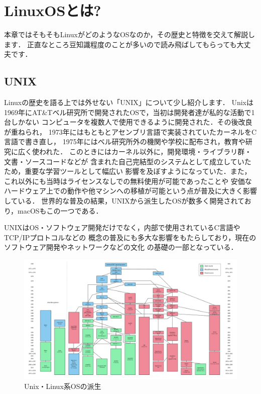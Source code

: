 \documentclass[autodetect-engine,dvi=dvipdfmx,ja=standard,a4j]{bxjsarticle}
\begin{document}
\section{LinuxOSとは?}
本章ではそもそもLinuxがどのようなOSなのか，その歴史と特徴を交えて解説します．
正直なところ豆知識程度のことが多いので読み飛ばしてもらっても大丈夫です．

\subsection{UNIX}
Linuxの歴史を語る上では外せない「UNIX」について少し紹介します．
Unixは1969年にAT\&Tベル研究所で開発されたOSで，当初は開発者達が私的な活動で1台しかない
コンピュータを複数人で使用できるように開発された．その後改良が重ねられ，
1973年にはもともとアセンブリ言語で実装されていたカーネルをC言語で書き直し，
1975年にはベル研究所外の機関や学校に配布され，教育や研究に広く使われた．
このときにはカーネル以外に，開発環境・ライブラリ群・文書・ソースコードなどが
含まれた自己完結型のシステムとして成立していたため，重要な学習ツールとして幅広い
影響を及ぼすようになっていた．また，これ以外にも当時はライセンスなしでの無料使用が可能であったことや
安価なハードウェア上での動作や他マシンへの移植が可能という点が普及に大きく影響している．
世界的な普及の結果，UNIXから派生したOSが数多く開発されており，macOSもこの一つである．

UNIXはOS・ソフトウェア開発だけでなく，内部で使用されているC言語やTCP/IPプロトコルなどの
概念の普及にも多大な影響をもたらしており，現在のソフトウェア開発やネットワークなどの文化
の基礎の一部となっている．

\begin{figure}[H]
    \centering
    \includegraphics[width=150mm]{image/Unix_history-simple.svg.png}
    \caption*{Unix・Linux系OSの派生}
    \label{fig:Unix-history}
\end{figure}
\end{document}
